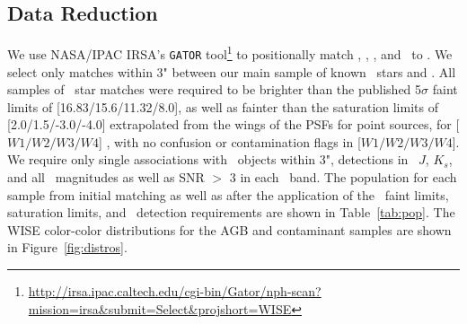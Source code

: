 \subsection{Data Reduction}
We use NASA/IPAC IRSA's {\tt GATOR} tool\footnote{\url{http://irsa.ipac.caltech.edu/cgi-bin/Gator/nph-scan?mission=irsa&submit=Select&projshort=WISE}} to positionally match \sdss, \ogle, \macho, and \simbad\, to \allwise. We select only matches within 3" between our main sample of known \agb\, stars and \allwise. All samples of \agb\, star matches were required to be brighter than the published 5$\sigma$ faint limits of [16.83/15.6/11.32/8.0], as well as fainter than the saturation limits of [2.0/1.5/-3.0/-4.0] extrapolated from the wings of the PSFs for point sources, for [$W1/W2/W3/W4$] \citep{2013wise.rept....1C}, with no confusion or contamination flags in [$W1/W2/W3/W4$]. We require only single associations with \twomass\, objects within 3", detections in \twomass\, $J$, $K_s$, and all \allwise\, magnitudes as well as SNR $>$ 3 in each \allwise\, band. 
The population for each sample from initial matching as well as after the application of the \allwise\, faint limits, saturation limits, and \twomass\, detection requirements are shown in Table~\ref{tab:pop}. The WISE color-color distributions for the AGB and contaminant samples are shown in Figure~\ref{fig:distros}. \\

